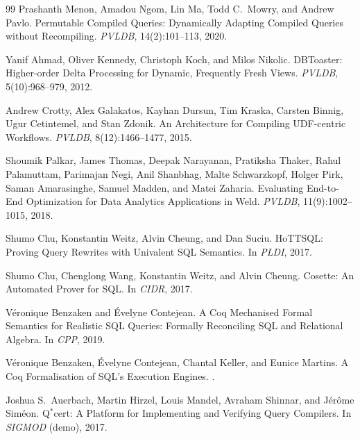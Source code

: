 \documentclass[sigconf, nonacm]{acmart}
\begin{document}
\begin{thebibliography}{99}
Prashanth Menon, Amadou Ngom, Lin Ma, Todd C.\ Mowry, and Andrew Pavlo.
\newblock Permutable Compiled Queries: Dynamically Adapting Compiled Queries without Recompiling.
\newblock \emph{PVLDB}, 14(2):101--113, 2020.

Yanif Ahmad, Oliver Kennedy, Christoph Koch, and Milos Nikolic.
\newblock DBToaster: Higher-order Delta Processing for Dynamic, Frequently Fresh Views.
\newblock \emph{PVLDB}, 5(10):968--979, 2012.
\newblock %

Andrew Crotty, Alex Galakatos, Kayhan Dursun, Tim Kraska, Carsten Binnig, Ugur Cetintemel, and Stan Zdonik.
\newblock An Architecture for Compiling UDF-centric Workflows.
\newblock \emph{PVLDB}, 8(12):1466--1477, 2015.
\newblock %

Shoumik Palkar, James Thomas, Deepak Narayanan, Pratiksha Thaker, Rahul Palamuttam, Parimajan Negi, Anil Shanbhag, Malte Schwarzkopf, Holger Pirk, Saman Amarasinghe, Samuel Madden, and Matei Zaharia.
\newblock Evaluating End-to-End Optimization for Data Analytics Applications in Weld.
\newblock \emph{PVLDB}, 11(9):1002--1015, 2018.

Shumo Chu, Konstantin Weitz, Alvin Cheung, and Dan Suciu.
\newblock HoTTSQL: Proving Query Rewrites with Univalent SQL Semantics.
\newblock In \emph{PLDI}, 2017.

Shumo Chu, Chenglong Wang, Konstantin Weitz, and Alvin Cheung.
\newblock Cosette: An Automated Prover for SQL.
\newblock In \emph{CIDR}, 2017.

V{\'e}ronique Benzaken and {\'E}velyne Contejean.
\newblock A Coq Mechanised Formal Semantics for Realistic SQL Queries: Formally Reconciling SQL and Relational Algebra.
\newblock In \emph{CPP}, 2019.
\newblock %

V{\'e}ronique Benzaken, {\'E}velyne Contejean, Chantal Keller, and Eunice Martins.
\newblock A Coq Formalisation of SQL's Execution Engines.
\newblock %
.

Joshua S.\ Auerbach, Martin Hirzel, Louis Mandel, Avraham Shinnar, and J{\'e}r{\^o}me Sim{\'e}on.
\newblock Q$^\ast$cert: A Platform for Implementing and Verifying Query Compilers.
\newblock In \emph{SIGMOD} (demo), 2017.


\end{thebibliography}
\end{document}
